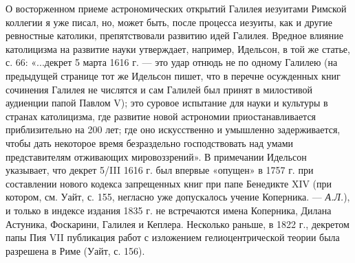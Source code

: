О восторженном приеме астрономических открытий Галилея иезуитами Римской
коллегии я уже писал, но, может быть, после процесса иезуиты, как и другие
ревностные католики, препятствовали развитию идей Галилея. Вредное влияние
католицизма на развитие науки утверждает, например, Идельсон, в той же статье,
с. 66: «...декрет 5 марта 1616 г. --- это удар отнюдь не по одному Галилею (на
предыдущей странице тот же Идельсон пишет, что в перечне осужденных книг
сочинения Галилея не числятся и сам Галилей был принят в милостивой аудиенции
папой Павлом V); это суровое испытание для науки и культуры в странах
католицизма, где развитие новой астрономии приостанавливается приблизительно на
200 лет; где оно искусственно и умышленно задерживается, чтобы дать некоторое
время безраздельно господствовать над умами представителям отживающих
мировоззрений». В примечании Идельсон указывает, что декрет 5/III 1616 г. был
впервые «опущен» в 1757 г. при составлении нового кодекса запрещенных книг при
папе Бенедикте XIV (при котором, см. Уайт, с. 155, негласно уже допускалось
учение Коперника. --- \emph{А.Л.}), и только в индексе издания 1835 г. не встречаются
имена Коперника, Дилана Астуника, Фоскарини, Галилея и Кеплера. Несколько
раньше, в 1822 г., декретом папы Пия VII публикация работ с изложением
гелиоцентрической теории была разрешена в Риме (Уайт, с. 156).

